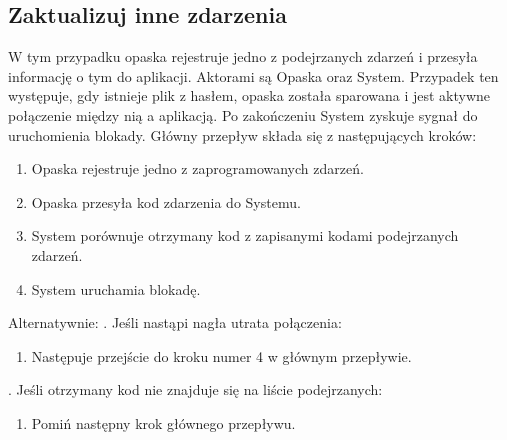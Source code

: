 \subsection{Zaktualizuj inne zdarzenia}
W tym przypadku opaska rejestruje jedno z podejrzanych zdarzeń i przesyła informację o tym do aplikacji. Aktorami są Opaska oraz System. Przypadek ten występuje, gdy istnieje plik z hasłem, opaska została sparowana i jest aktywne połączenie między nią a aplikacją. Po zakończeniu System zyskuje sygnał do uruchomienia blokady. Główny przepływ składa się z następujących kroków:
\begin{enumerate}
    \item Opaska rejestruje jedno z zaprogramowanych zdarzeń.
    \item Opaska przesyła kod zdarzenia do Systemu.
    \item System porównuje otrzymany kod z zapisanymi kodami podejrzanych zdarzeń.
    \item System uruchamia blokadę.
\end{enumerate}
Alternatywnie:
\newline\newline
{}. Jeśli nastąpi nagła utrata połączenia:
\begin{enumerate}[leftmargin=3\parindent]
    \item Następuje przejście do kroku numer 4 w głównym przepływie.
\end{enumerate}
\quad\newline
{}. Jeśli otrzymany kod nie znajduje się na liście podejrzanych:
\begin{enumerate}[leftmargin=3\parindent]
    \item Pomiń następny krok głównego przepływu.
\end{enumerate}
